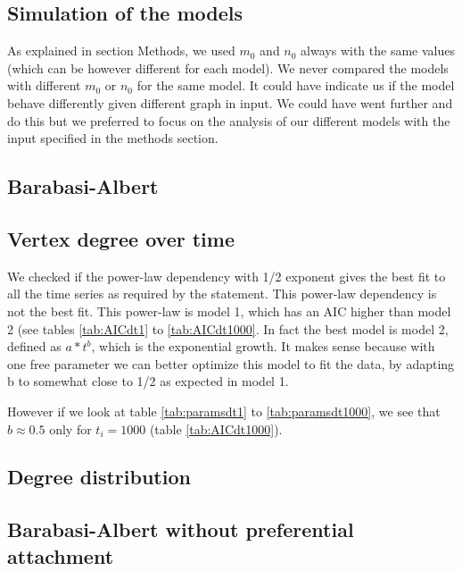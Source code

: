 \documentclass{article}
\begin{document}
\subsection{Simulation of the models}

As explained in section Methods, we used $m_0$ and $n_0$ always with the same 
values (which can be however different for each model). We never compared the 
models with different $m_0$ or $n_0$ for the same model. It could have indicate 
us if the model behave differently given different graph in input. We could have 
went further and do this but we preferred to focus on the analysis of our 
different models with the input specified in the methods section.

\subsection{Barabasi-Albert}


\subsection{Vertex degree over time}

We checked if the power-law dependency with 1/2 exponent gives the best fit to 
all the time series as required by the statement. This power-law dependency is 
not the best fit. This power-law is model 1, which has an AIC higher than model 
2 (see tables \ref{tab:AICdt1} to \ref{tab:AICdt1000}. In fact the best model is 
model 2, defined as \textbf{$a*{t^b}$}, which is the exponential growth. It 
makes sense because with one free parameter we can better optimize this model to 
fit the data, by adapting b to somewhat close to 1/2 as expected in model 1.

However if we look at table \ref{tab:paramsdt1} to \ref{tab:paramsdt1000}, we 
see that $b \approx 0.5$ only for $t_i = 1000$ (table \ref{tab:AICdt1000}).

\subsection{Degree distribution}

\subsection{Barabasi-Albert without preferential attachment}
\end{document}
